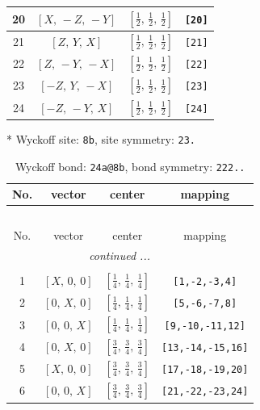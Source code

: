 \documentclass[fleqn,8pt]{jsarticle}
\begin{document}
\begin{longtable}{cccc}
20 & $\left[ X,\, - Z,\, - Y \right]$ & $\left[ \frac{1}{2},\, \frac{1}{2},\, \frac{1}{2} \right]$ & {\tt [20]} \\ \hline
21 & $\left[ Z,\, Y,\, X \right]$ & $\left[ \frac{1}{2},\, \frac{1}{2},\, \frac{1}{2} \right]$ & {\tt [21]} \\ \hline
22 & $\left[ Z,\, - Y,\, - X \right]$ & $\left[ \frac{1}{2},\, \frac{1}{2},\, \frac{1}{2} \right]$ & {\tt [22]} \\ \hline
23 & $\left[ - Z,\, Y,\, - X \right]$ & $\left[ \frac{1}{2},\, \frac{1}{2},\, \frac{1}{2} \right]$ & {\tt [23]} \\ \hline
24 & $\left[ - Z,\, - Y,\, X \right]$ & $\left[ \frac{1}{2},\, \frac{1}{2},\, \frac{1}{2} \right]$ & {\tt [24]} \\
\end{longtable}
* Wyckoff site: {\tt 8b}, site symmetry: {\tt 23.}
\renewcommand{\arraystretch}{1.2}
\begin{longtable}{cccc}
\caption{Wyckoff bond: {\tt 24a@8b}, bond symmetry: {\tt 222..}}
 \\
 \hline \hline
No. & vector & center & mapping \\ \hline \endfirsthead

\multicolumn{3}{l}{\tablename\ \thetable{}} \\
 \hline \hline
No. & vector & center & mapping \\ \hline \endhead

 \hline \hline
\multicolumn{3}{r}{\footnotesize\it continued ...} \\ \endfoot

 \hline \hline
\multicolumn{3}{r}{} \\ \endlastfoot

1 & $\left[ X,\, 0,\, 0 \right]$ & $\left[ \frac{1}{4},\, \frac{1}{4},\, \frac{1}{4} \right]$ & {\tt [1,-2,-3,4]} \\ \hline
2 & $\left[ 0,\, X,\, 0 \right]$ & $\left[ \frac{1}{4},\, \frac{1}{4},\, \frac{1}{4} \right]$ & {\tt [5,-6,-7,8]} \\ \hline
3 & $\left[ 0,\, 0,\, X \right]$ & $\left[ \frac{1}{4},\, \frac{1}{4},\, \frac{1}{4} \right]$ & {\tt [9,-10,-11,12]} \\ \hline
4 & $\left[ 0,\, X,\, 0 \right]$ & $\left[ \frac{3}{4},\, \frac{3}{4},\, \frac{3}{4} \right]$ & {\tt [13,-14,-15,16]} \\ \hline
5 & $\left[ X,\, 0,\, 0 \right]$ & $\left[ \frac{3}{4},\, \frac{3}{4},\, \frac{3}{4} \right]$ & {\tt [17,-18,-19,20]} \\ \hline
6 & $\left[ 0,\, 0,\, X \right]$ & $\left[ \frac{3}{4},\, \frac{3}{4},\, \frac{3}{4} \right]$ & {\tt [21,-22,-23,24]} \\
\end{longtable}
\end{document}
